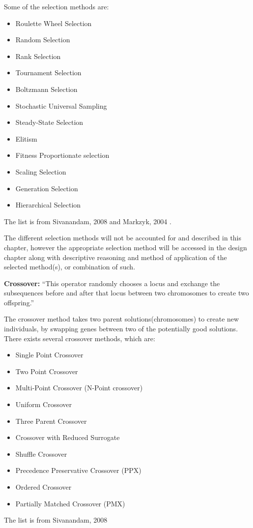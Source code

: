 Some of the selection methods are:
\begin{itemize}
\item Roulette Wheel Selection
\item Random Selection
\item Rank Selection
\item Tournament Selection
\item Boltzmann Selection
\item Stochastic Universal Sampling
\item Steady-State Selection
\item Elitism
\item Fitness Proportionate selection
\item Scaling Selection
\item Generation Selection
\item Hierarchical Selection
\end{itemize}
The list is from Sivanandam, 2008 \cite[pp. 46-50]{Sivanandam2008} and Markzyk, 2004 \cite{Adam2004}.

The different selection methods will not be accounted for and described in this chapter, however the appropriate selection method will be accessed in the design chapter along with descriptive reasoning and method of application of the selected method(s), or combination of such.

\textbf{Crossover:} \enquote{This operator randomly chooses a locus and exchange the subsequences before and after that locus between two chromosomes to create two offspring.} \cite[pp. 8]{Melanie1990}

The crossover method takes two parent solutions(chromosomes) to create new individuals, by swapping genes between two of the potentially good solutions. There exists several crossover methods, which are:


\begin{itemize}
\item Single Point Crossover
\item Two Point Crossover
\item Multi-Point Crossover (N-Point crossover)
\item Uniform Crossover
\item Three Parent Crossover
\item Crossover with Reduced Surrogate
\item Shuffle Crossover
\item Precedence Preservative Crossover (PPX)
\item Ordered Crossover
\item Partially Matched Crossover (PMX)
\end{itemize}
The list is from Sivanandam, 2008 \cite[pp. 50-56]{Sivanandam2008}

